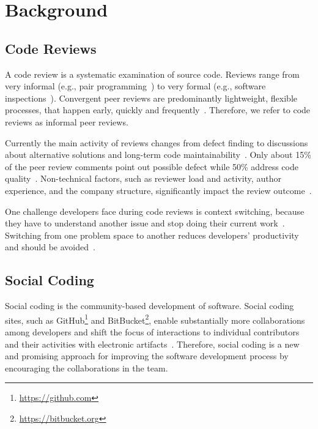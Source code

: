 
\section{Background}
\subsection{Code Reviews}
A code review is a systematic examination of source code. 
%
Reviews range from very informal (e.g., pair programming~\cite{beck2000extreme}) to very formal (e.g., software inspections~\cite{fagan2001design, ackerman1989software}). 
%
Convergent peer reviews are predominantly lightweight, flexible processes, that happen early, quickly and frequently~\cite{rigby2013PeerCodeReviews, shimagaki2016CRInSony, rigby2012contemporary, rigby2014PeerReviewOSS}. 
%
Therefore, we refer to code reviews as informal peer reviews.
%

%
Currently the main activity of reviews changes from defect finding to discussions about alternative solutions and long-term code maintainability~\cite{rigby2013PeerCodeReviews, czerwonka2015codereviews}.
%
Only about 15\% of the peer review comments point out possible defect while 50\% address code quality~\cite{czerwonka2015codereviews}.
%
Non-technical factors, such as reviewer load and activity, author experience, and the company structure, significantly impact the review outcome~\cite{baysal2013influence, baysal2016investigating}.

%
One challenge developers face during code reviews is context switching, because they have to understand another issue and stop doing their current work~\cite{czerwonka2015codereviews, kononenko2016codereviewquality}.
%
Switching from one problem space to another reduces developers' productivity and should be avoided~\cite{poppendieck2003lean}. 

\subsection{Social Coding}
Social coding is the community-based development of software.
%
Social coding sites, such as GitHub\footnote{\url{https://github.com}} and BitBucket\footnote{\url{https://bitbucket.org}}, enable substantially more collaborations among developers \cite{thung2013github} and shift the focus of interactions to individual contributors and their activities with electronic artifacts~\cite{dabbish2012social, storey2012msr}.
%
Therefore, social coding is a new and promising approach for improving the software development process by encouraging the collaborations in the team.